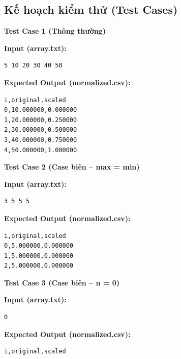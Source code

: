 \subsection{Kế hoạch kiểm thử (Test Cases)}

\textbf{Test Case 1 (Thông thường)}

\textbf{Input (array.txt):}
\begin{lstlisting}
5 10 20 30 40 50
\end{lstlisting}

\textbf{Expected Output (normalized.csv):}
\begin{lstlisting}
i,original,scaled
0,10.000000,0.000000
1,20.000000,0.250000
2,30.000000,0.500000
3,40.000000,0.750000
4,50.000000,1.000000
\end{lstlisting}

\vspace{0.5cm}

\textbf{Test Case 2 (Case biên -- max = min)}

\textbf{Input (array.txt):}
\begin{lstlisting}
3 5 5 5
\end{lstlisting}

\textbf{Expected Output (normalized.csv):}
\begin{lstlisting}
i,original,scaled
0,5.000000,0.000000
1,5.000000,0.000000
2,5.000000,0.000000
\end{lstlisting}

\vspace{0.5cm}

\textbf{Test Case 3 (Case biên -- n = 0)}

\textbf{Input (array.txt):}
\begin{lstlisting}
0
\end{lstlisting}

\textbf{Expected Output (normalized.csv):}
\begin{lstlisting}
i,original,scaled
\end{lstlisting}